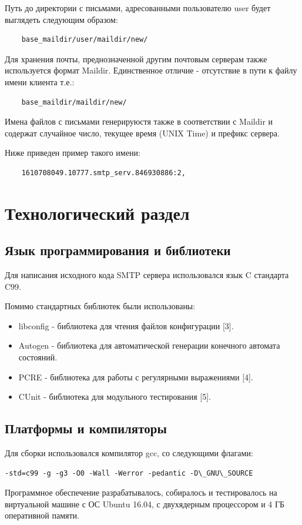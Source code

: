 \documentclass[a4paper,12pt]{report}
\begin{document}
Путь до директории с письмами, адресованными пользователю user будет выглядеть следующим образом:
\begin{lstlisting}
	base_maildir/user/maildir/new/
\end{lstlisting}

Для хранения почты, преднозначенной другим почтовым серверам также используется формат Maildir. Единственное отличие - отсутствие в пути к файлу имени клиента т.е.: 
\begin{lstlisting}
	base_maildir/maildir/new/
\end{lstlisting}

Имена файлов с письмами генерируюстя также в соответствии с Maildir и содержат случайное число, текущее время (UNIX Time) и префикс сервера. 

Ниже приведен пример такого имени: 
\begin{lstlisting}
	1610708049.10777.smtp_serv.846930886:2,
\end{lstlisting}

\chapter{Технологический раздел}

\section{Язык программирования и библиотеки}

Для написания исходного кода SMTP сервера использовался язык C стандарта C99.

Помимо стандартных библиотек были использованы:
\begin{itemize}
    \item libconfig - библиотека для чтения файлов конфигурации [3].  
    \item Autogen - библиотека для автоматической генерации конечного автомата состояний.
    \item PCRE - библиотека для работы с регулярными выражениями [4]. 
    \item CUnit - библиотека для модульного тестирования [5].
\end{itemize}


\section{Платформы и компиляторы}

Для сборки использовался компилятор gcc, со следующими флагами: 
\begin{lstlisting}
-std=c99 -g -g3 -O0 -Wall -Werror -pedantic -D\_GNU\_SOURCE
\end{lstlisting}
Программное обеспечение разрабатывалось, собиралось и тестировалось на виртуальной машине с ОС Ubuntu 16.04, с двухядерным процессором и 4 ГБ оперативной памяти. 
\end{document}
